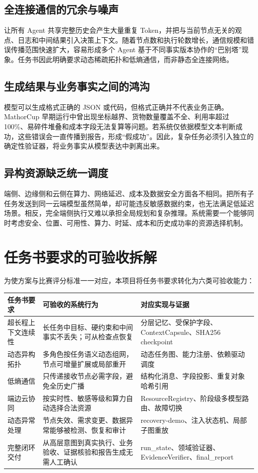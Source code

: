 \documentclass[UTF8,a4paper,12pt,oneside]{ctexbook}
\begin{document}
\subsection{全连接通信的冗余与噪声}
让所有 Agent 共享完整历史会产生大量重复 Token，并把与当前节点无关的观点、日志和中间结果引入决策上下文。随着节点数和执行轮数增长，通信规模和错误传播范围快速扩大，容易形成多个 Agent 基于不同事实版本协作的“巴别塔”现象。任务书因此明确要求动态稀疏拓扑和低熵通信，而非静态全连接网络。

\subsection{生成结果与业务事实之间的鸿沟}
模型可以生成格式正确的 JSON 或代码，但格式正确并不代表业务正确。MathorCup 早期运行中曾出现坐标越界、货物数量覆盖不全、利用率超过 100\%、易碎件堆叠和成本字段无法复算等问题。若系统仅依据模型文本判断成功，这些错误会一直传播到报告，形成“假成功”。因此，复杂任务必须引入独立的确定性验证器，将业务事实从模型表达中剥离出来。

\subsection{异构资源缺乏统一调度}
端侧、边缘侧和云侧在算力、网络延迟、成本及数据安全方面各不相同。把所有子任务发送到同一云端模型虽然简单，却可能违反敏感数据约束，也无法满足低延迟场景。相反，完全端侧执行又难以承担全局规划和复杂推理。系统需要一个能够同时考虑安全、位置、可用性、算力、时延、成本和历史成功率的资源选择机制。

\section{任务书要求的可验收拆解}
为使方案与比赛评分标准一一对应，本项目将任务书要求转化为六类可验收能力：
\begin{longtable}{p{}p{}p{}}
\toprule
任务书要求 & 可验收的系统行为 & 对应实现与证据\\
\midrule
超长程上下文连续性 & 长任务中目标、硬约束和中间事实不丢失；可从检查点恢复 & 分层记忆、受保护字段、ContextCapsule、SHA256 checkpoint\\
动态异构拓扑 & 多角色按任务语义动态组网，节点可增量扩展或局部重开 & 动态任务图、能力注册、依赖驱动调度\\
低熵通信 & 只传递接收节点必需字段，避免全历史广播 & 结构化消息、字段投影、重复对象哈希引用\\
端边云协同 & 按实时性、敏感等级和算力自动选择合法资源 & ResourceRegistry、阶段级多模型路由、故障切换\\
动态异常处理 & 节点失效、需求变更、数据异常能够被检测、恢复和审计 & recovery-demo、注入状态机、局部子图重放\\
完整闭环交付 & 从高层意图到真实执行、业务验收、证据核验和报告生成无需人工确认 & run\_state、领域验证器、EvidenceVerifier、final\_report\\
\bottomrule
\end{longtable}
\end{document}
